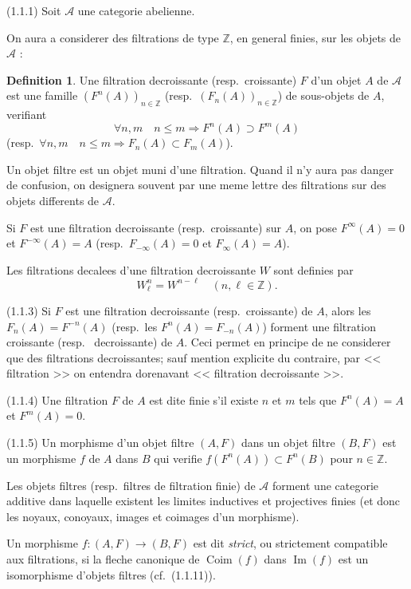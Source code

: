 \documentclass[11pt,a4paper]{amsart}
\theoremstyle{plain}
\theoremstyle{definition}
\newtheorem{definition}[theorem]{Definition}
\theoremstyle{remark}
\DeclareMathOperator{\Coim}{Coim}
\DeclareMathOperator{\IIm}{Im}
\newcommand{\sA}{\mathscr{A}}
\newcommand{\bZ}{\mathbb{Z}}
\numberwithin{equation}{subsection}
\begin{document}
(1.1.1) Soit $\sA$ une categorie abelienne.

On aura a considerer des filtrations de type $\bZ$, en general finies, sur les objets
de $\sA$ :

\begin{definition}\label{def:1.1.2}
Une filtration decroissante (resp.~croissante) $F$ d'un objet $A$
de $\sA$ est une famille $(F^n(A))_{n \in \bZ}$ (resp.~$(F_n(A))_{n \in \bZ}$) de sous-objets de $A$, verifiant
\[
\forall n, m \quad n \leqslant m \Rightarrow F^n(A) \supset F^m(A)
\]
(resp.~$\forall n, m \quad n \leqslant m \Rightarrow F_n(A) \subset F_m(A)$).
\end{definition}

Un objet filtre est un objet muni d'une filtration. Quand il n'y aura pas danger
de confusion, on designera souvent par une meme lettre des filtrations sur des objets
differents de $\sA$.

Si $F$ est une filtration decroissante (resp.~croissante) sur $A$, on pose $F^{\infty}(A)=0$
et $F^{-\infty}(A)=A$ (resp.~$F_{-\infty}(A)=0$ et $F_{\infty}(A)=A$).

Les filtrations decalees d'une filtration decroissante $W$ sont definies par
\[
W^n_{\ell} = W^{n-\ell} \quad (n, \ell \in \bZ).
\]

(1.1.3) Si $F$ est une filtration decroissante (resp.~croissante) de $A$, alors les
$F_n(A) = F^{-n}(A)$ (resp.~les $F^n(A) = F_{-n}(A)$) forment une filtration croissante (resp.~
decroissante) de $A$. Ceci permet en principe de ne considerer que des filtrations
decroissantes; sauf mention explicite du contraire, par << filtration >> on entendra dorenavant
<< filtration decroissante >>.

(1.1.4) Une filtration $F$ de $A$ est dite finie s'il existe $n$ et $m$ tels que $F^n(A)=A$
et $F^m(A)=0$.

(1.1.5) Un morphisme d'un objet filtre $(A, F)$ dans un objet filtre $(B, F)$ est un
morphisme $f$ de $A$ dans $B$ qui verifie $f(F^n(A)) \subset F^n(B)$ pour $n \in \bZ$.

Les objets filtres (resp.~filtres de filtration finie) de $\sA$ forment une categorie additive
dans laquelle existent les limites inductives et projectives finies (et donc les noyaux,
conoyaux, images et coimages d'un morphisme).

Un morphisme $f : (A, F) \to (B, F)$ est dit \emph{strict}, ou strictement compatible aux filtrations,
si la fleche canonique de $\Coim(f)$ dans $\IIm(f)$ est un isomorphisme d'objets filtres
(cf.~(1.1.11)).
\end{document}
